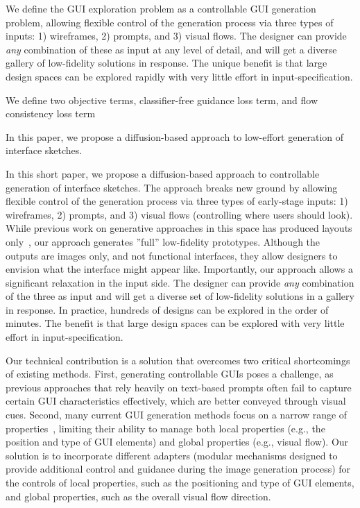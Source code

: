 We define the GUI exploration problem as a controllable GUI generation problem, allowing flexible control of the generation process via three types of inputs: 1) wireframes, 2) prompts, and 3) visual flows. The designer can provide \emph{any} combination of these as input at any level of detail, and will get a diverse gallery of low-fidelity solutions in response. The unique benefit is that large design spaces can be explored rapidly with very little effort in input-specification.

We define two objective terms, classifier-free guidance loss term, and flow consistency loss term

In this paper, we propose a diffusion-based approach to low-effort generation of interface sketches. 




In this short paper, we propose a diffusion-based approach to controllable generation of interface sketches. 
The approach breaks new ground by allowing flexible control of the generation process via three types of early-stage inputs: 1) wireframes, 2) prompts, and 3) visual flows (controlling where users should look). 
%
While previous work on generative approaches in this space has produced layouts only~\cite{cheng2023play, cheng2024colay}, our approach generates ''full'' low-fidelity prototypes. Although the outputs are images only, and not functional interfaces, they allow designers to envision what the interface might appear like. 
%
Importantly, our approach allows a significant relaxation in the input side. 
The designer can provide \emph{any} combination of the three as input and will get a diverse set of low-fidelity solutions in a gallery in response. 
In practice, hundreds of designs can be explored in the order of minutes.
%
The benefit is that large design spaces can be explored with very little effort in input-specification. 

Our technical contribution is a solution that overcomes two critical shortcomings of existing methods. 
First, generating controllable GUIs poses a challenge, as previous approaches that rely heavily on text-based prompts often fail to capture certain GUI characteristics effectively, which are better conveyed through visual cues.
Second, many current GUI generation methods focus on a narrow range of properties~\cite{cheng2023play, cheng2024colay}, limiting their ability to manage both local properties (e.g., the position and type of GUI elements) and global properties (e.g., visual flow).
%
Our solution is to incorporate different adapters (modular mechanisms designed to provide additional control and guidance during the image generation process) for the controls of local properties, such as the positioning and type of GUI elements, and global properties, such as the overall visual flow direction. 


